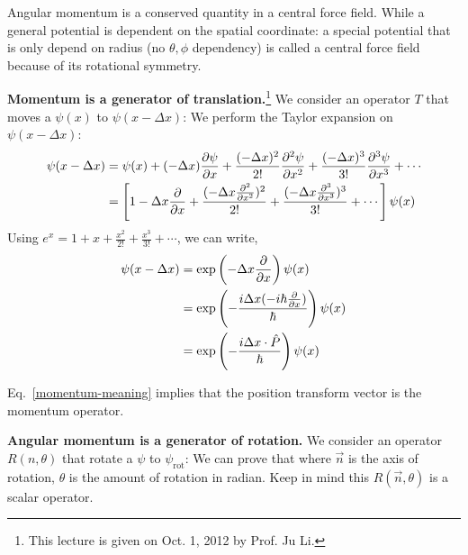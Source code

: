 \documentclass{school-22.101-notes}
\date{October 12, 2011}
\begin{document}
\maketitle

Angular momentum is a conserved quantity in a central force field. While a general potential is dependent on the spatial coordinate:
a special potential that is only depend on radius (no $\theta, \phi$ dependency) is called a central force field because of its rotational symmetry. 


\textbf{Momentum is a generator of translation.}\footnote{This lecture is given on Oct. 1, 2012 by Prof. Ju Li.} We consider an operator $T$ that moves a $\psi(x)$ to $\psi(x-\Delta x)$: 
We perform the Taylor expansion on $\psi(x - \Delta x)$: 
\begin{align}
  \psi(x - \Delta x) &= \psi(x) + (-\Delta x) \frac{\partial \psi}{\partial x} + \frac{(-\Delta x)^2}{2!} \frac{\partial^{2} \psi}{\partial x ^{2}} + \frac{(-\Delta x)^3}{3!} \frac{\partial^{3} \psi}{\partial x ^{3}} + \cdots \\
  &= \left[ 1 - \Delta x \frac{\partial}{\partial x} + \frac{(-\Delta x \frac{\partial^{2} }{\partial x ^{2}})^2}{2!} + \frac{(-\Delta x \frac{\partial^{3} }{\partial x ^{3}})^3}{3!} + \cdots \right] \psi(x) 
\end{align}
Using $e^x = 1 + x + \frac{x^2}{2!} + \frac{x^3}{3!} + \cdots$, we can write, 
\begin{align}
  \psi(x - \Delta x) &= \exp \left( -\Delta x \frac{\partial}{\partial x} \right) \psi(x) \\
  &= \exp \left(- \frac{i \Delta x (-i \hbar \frac{\partial}{\partial x})}{\hbar} \right) \psi(x) \\
  &= \exp \left(-\frac{i \Delta x \cdot \hat{P} }{\hbar} \right) \psi(x) \label{momentum-meaning}
\end{align}

Eq.~\ref{momentum-meaning} implies that the position transform vector is the momentum operator. 


\textbf{Angular momentum is a generator of rotation.} We consider an operator $R(n, \theta)$ that rotate a $\psi$ to $\psi_{\mathrm{rot}}$: 
We can prove that 
where $\vec{n}$ is the axis of rotation, $\theta$ is the amount of rotation in radian.  Keep in mind this $R(\vec{n}, \theta)$ is a scalar operator. 
\end{document}
